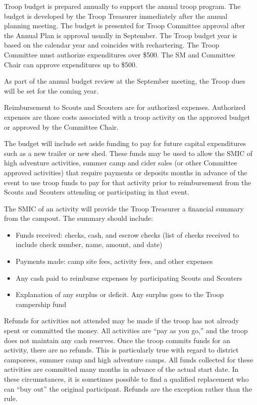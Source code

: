 \documentclass{ltxguide}
\begin{document}
Troop budget is prepared annually to support the annual troop program. The budget is developed by the Troop Treasurer immediately after the annual planning meeting. The budget is presented for Troop Committee approval after the Annual Plan is approval usually in September. The Troop budget year is based on the calendar year and coincides with rechartering. The Troop Committee must authorize expenditures over \$500. The SM and Committee Chair can approve expenditures up to \$500.

As part of the annual budget review at the September meeting, the Troop dues will be set for the coming year.

Reimbursement to Scouts and Scouters are for authorized expenses. Authorized expenses are those costs associated with a troop activity on the approved budget or approved by the Committee Chair.

The budget will include set aside funding to pay for future capital expenditures such as a new trailer or new shed. These funds may be used to allow the SMIC of high adventure activities, summer camp and cider sales (or other Committee approved activities) that require payments or deposits months in advance of the event to use troop funds to pay for that activity prior to reimbursement from the Scouts and Scouters attending or participating in that event.

The SMIC of an activity will provide the Troop Treasurer a financial summary from the campout. The summary should include:
\begin{itemize}
	\item Funds received: checks, cash, and escrow checks (list of checks received to include check number, name, amount, and date)
	\item Payments made: camp site fees, activity fees, and other expenses
	\item Any cash paid to reimburse expenses by participating Scouts and Scouters
	\item Explanation of any surplus or deficit. Any surplus goes to the Troop campership fund
\end{itemize}

Refunds for activities not attended may be made if the troop has not already spent or committed the money. All activities are “pay as you go,” and the troop does not maintain any cash reserves. Once the troop commits funds for an activity, there are no refunds. This is particularly true with regard to district camporees, summer camp and high adventure camps. All funds collected for these activities are committed many months in advance of the actual start date. In these circumstances, it is sometimes possible to find a qualified replacement who can “buy out” the original participant. Refunds are the exception rather than the rule.
\end{document}
